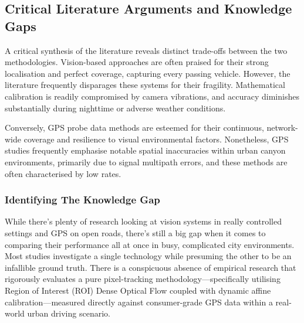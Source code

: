 \subsection{Critical Literature Arguments and Knowledge Gaps}
A critical synthesis of the literature reveals distinct trade-offs between the two methodologies. Vision-based approaches are often praised for their strong localisation and perfect coverage, capturing every passing vehicle. However, the literature frequently disparages these systems for their fragility. Mathematical calibration is readily compromised by camera vibrations, and accuracy diminishes substantially during nighttime or adverse weather conditions.

Conversely, GPS probe data methods are esteemed for their continuous, network-wide coverage and resilience to visual environmental factors. Nonetheless, GPS studies frequently emphasise notable spatial inaccuracies within urban canyon environments, primarily due to signal multipath errors, and these methods are often characterised by low rates.

\subsubsection{Identifying The Knowledge Gap}
While there's plenty of research looking at vision systems in really controlled settings and GPS on open roads, there's still a big gap when it comes to comparing their performance all at once in busy, complicated city environments. Most studies investigate a single technology while presuming the other to be an infallible ground truth. There is a conspicuous absence of empirical research that rigorously evaluates a pure pixel-tracking methodology—specifically utilising Region of Interest (ROI) Dense Optical Flow coupled with dynamic affine calibration—measured directly against consumer-grade GPS data within a real-world urban driving scenario.
